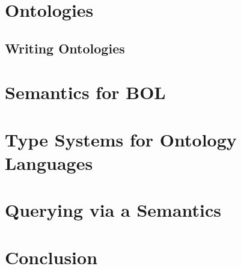 \documentclass{book}
\begin{document}
\chapter{Ontologies}
 
 \section{Writing Ontologies}\label{sec:onto:write}
   

\chapter{Semantics for BOL}\label{sec:bolsem}
 

\chapter{Type Systems for Ontology Languages}\label{sec:onto:type}
   

\chapter{Querying via a Semantics}\label{sec:bolquery}
 

\chapter{Conclusion}\label{sec:wuv:conc}

%
%
%
%
%
%


\end{document}

